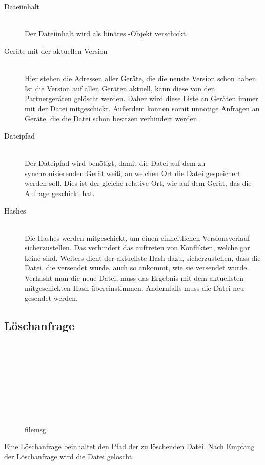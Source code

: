 \begin{description}
	\item[{Dateiinhalt}] \hfill \\
		Der Dateiinhalt wird als binäres -Objekt verschickt.
	\item[{Geräte mit der aktuellen Version}] \hfill \\
		Hier stehen die Adressen aller Geräte, die die neuste Version schon haben. Ist die Version auf allen Geräten aktuell, kann diese von den Partnergeräten gelöscht werden. Daher wird diese Liste an Geräten immer mit der Datei mitgeschickt. Außerdem können somit unnötige Anfragen an Geräte, die die Datei schon besitzen verhindert werden.
	\item[{Dateipfad}] \hfill \\
		Der Dateipfad wird benötigt, damit die Datei auf dem zu synchronisierenden Gerät weiß, an welchen Ort die Datei gespeichert werden soll. Dies ist der gleiche relative Ort, wie auf dem Gerät, das die Anfrage geschickt hat.
	\item[{Hashes}] \hfill \\
		Die Hashes werden mitgeschickt, um einen einheitlichen Versionsverlauf sicherzustellen. Das verhindert das auftreten von Konflikten, welche gar keine sind. Weiters dient der aktuellste Hash dazu,  sicherzustellen, dass die Datei, die versendet wurde, auch so ankommt, wie sie versendet wurde. Verhasht man die neue Datei, muss das Ergebnis mit dem aktuellsten mitgeschickten Hash übereinstimmen. Andernfalls muss die Datei neu gesendet werden.
\end{description}
		
\subsection{Löschanfrage}
\begin{figure}[H]
\begin{centering}

\begin{bytefield}[bitwidth=3em]{8}
	\\
	 \\
	
	\begin{rightwordgroup}{\isprotomsgtype}
	\end{rightwordgroup} \\
	
	\begin{rightwordgroup}{\isprotomsgdata}
		 \\
		\skippedwords \\
		 \\
	\end{rightwordgroup}
	
\end{bytefield}
\par\end{centering}
\protect\caption{\gls{filemsg}}
\end{figure}		
Eine Löschanfrage beinhaltet den Pfad der zu löschenden Datei. Nach Empfang der Löschanfrage wird die Datei gelöscht.

